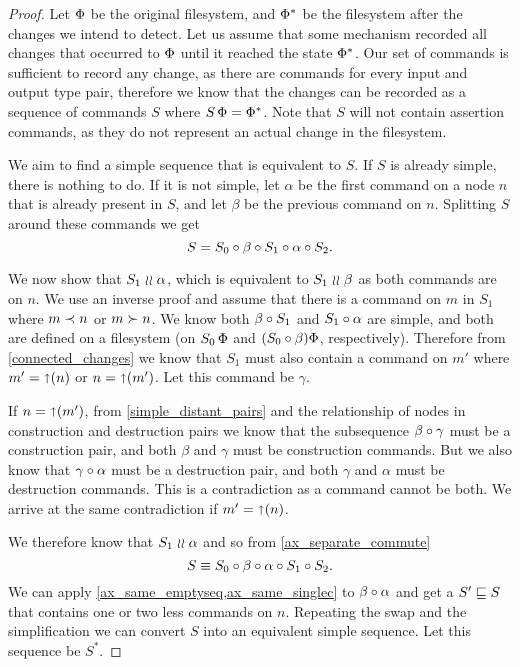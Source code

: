 \begin{proof}
Let $\Phi$ be the original filesystem, and $\Phi^*$
be the filesystem after the changes we intend to detect.
Let us assume that some mechanism recorded all changes that occurred
to $\Phi$ until it reached the state $\Phi^*$.
Our set of commands is sufficient to record any change, as
there are commands for every input and output type pair, therefore
we know that the changes can be recorded as a sequence of commands $S$
where $S\,\Phi=\Phi^*$.
Note that $S$ will not contain assertion commands, as they do not
represent an actual change in the filesystem.

\newcommand{\ucx}{\alpha}
\newcommand{\ucy}{\beta}
\newcommand{\ucz}{\gamma}

We aim to find a simple sequence that is equivalent to $S$.
If $S$ is already simple, there is nothing to do.
If it is not simple, let $\ucx$ be the first command
on a node $n$ that is already present in $S$,
and let $\ucy$ be the previous command on $n$.
Splitting $S$ around these commands we get
\[ S = S_0 \cc \ucy \cc S_1 \cc \ucx \cc S_2. \]

We now show that $S_1\indep\ucx$,
which is equivalent to $S_1\indep\ucy$ as both commands are on $n$.
We use an inverse proof and assume that there is a command on $m$ in $S_1$
where $m\prec n$ or $m\succ n$.
We know both $\ucy\cc S_1$ and $S_1\cc\ucx$ are simple,
and both are defined on a filesystem
(on $S_0\,\Phi$ and $(S_0\mathbin{\circ}\beta)\Phi$, respectively).
Therefore from \cref{connected_changes} we know that
$S_1$ must also contain a command on $m'$ where
$m'=\mathord{\shortuparrow}({n})$ or $n=\mathord{\shortuparrow}({m'})$.
Let this command be $\ucz$.

If $n=\mathord{\shortuparrow}({m'})$,
from \cref{simple_distant_pairs} 
and the relationship of nodes in construction and destruction pairs
we know that the subsequence
$\ucy\cc\ucz$ must be a construction pair,
and both $\ucy$ and $\ucz$ must be construction commands.
But we also know that $\ucz\cc\ucx$ must be a destruction pair,
and both $\ucz$ and $\ucx$ must be destruction commands.
This is a contradiction as a command cannot be both.
We arrive at the same contradiction if $m'=\mathord{\shortuparrow}({n})$.

We therefore know that $S_1\indep\ucx$ and so
from \cref{ax_separate_commute}
\[ S \equiv S_0\cc\ucy\cc\ucx\cc S_1 \cc S_2. \]
We can apply \cref{ax_same_emptyseq,ax_same_singlec} to
$\ucy\cc\ucx$ and get a $S'\sqsubseteq S$ that contains one or two less commands on $n$.
Repeating the swap and the simplification we
can convert $S$ into an equivalent simple sequence.
Let this sequence be $S^*$.


\end{proof}
